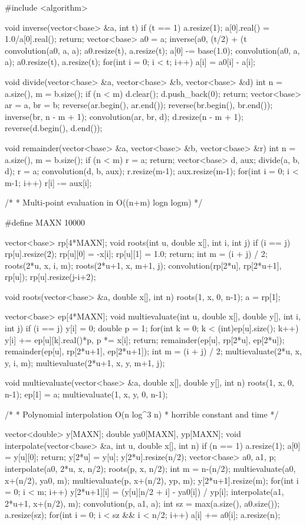 \documentclass[11pt]{article}
\begin{document}
\begin{vncode}
#include <algorithm>

void inverse(vector<base> &a, int t) {
	if (t == 1) {
		a.resize(1); a[0].real() = 1.0/a[0].real();
		return;
	}
	vector<base> a0 = a;
	inverse(a0, (t/2) + (t%
	convolution(a0, a, a);
	a0.resize(t), a.resize(t);
	a[0] -= base(1.0);
	convolution(a0, a, a);
	a0.resize(t), a.resize(t);
	for(int i = 0; i < t; i++) a[i] = a0[i] - a[i];
}

void divide(vector<base> &a, vector<base> &b, vector<base> &d) {
	int n = a.size(), m = b.size();
	if (n < m) {
		d.clear(); d.push_back(0);
		return;
	}
	vector<base> ar = a, br = b;
	reverse(ar.begin(), ar.end());
	reverse(br.begin(), br.end());
	inverse(br, n - m + 1);
	convolution(ar, br, d);
	d.resize(n - m + 1);
	reverse(d.begin(), d.end());
}

void remainder(vector<base> &a, vector<base> &b, vector<base> &r) {
	int n = a.size(), m = b.size();
	if (n < m) { r = a; return; }
	vector<base> d, aux;
	divide(a, b, d);
	r = a;
	convolution(d, b, aux);
	r.resize(m-1); aux.resize(m-1);
	for(int i = 0; i < m-1; i++) r[i] -= aux[i];
}

/*
 * Multi-point evaluation in O((n+m) logn logm)
 */

#define MAXN 10000

vector<base> rp[4*MAXN];
void roots(int u, double x[], int i, int j) {
	if (i == j) {
		rp[u].resize(2); rp[u][0] = -x[i];
		rp[u][1] = 1.0; return;
	}
	int m = (i + j) / 2;
	roots(2*u, x, i, m); roots(2*u+1, x, m+1, j);
	convolution(rp[2*u], rp[2*u+1], rp[u]);
	rp[u].resize(j-i+2);
}

void roots(vector<base> &a, double x[], int n) {
	roots(1, x, 0, n-1); a = rp[1];
}

vector<base> ep[4*MAXN];
void multievaluate(int u, double x[], double y[], int i, int j) {
	if (i == j) {
		y[i] = 0;
		double p = 1;
		for(int k = 0; k < (int)ep[u].size(); k++)
			y[i] += ep[u][k].real()*p, p *= x[i];
		return;
	}
	remainder(ep[u], rp[2*u], ep[2*u]);
	remainder(ep[u], rp[2*u+1], ep[2*u+1]);
	int m = (i + j) / 2;
	multievaluate(2*u, x, y, i, m);
	multievaluate(2*u+1, x, y, m+1, j);
}

void multievaluate(vector<base> &a, double x[], double y[], int n) {
	roots(1, x, 0, n-1); ep[1] = a;
	multievaluate(1, x, y, 0, n-1);
}

/*
 * Polynomial interpolation O(n log^3 n)
 * horrible constant and time
 */

vector<double> y[MAXN];
double ya0[MAXN], yp[MAXN];
void interpolate(vector<base> &a, int u, double x[], int n) {
	if (n == 1) {
		a.resize(1); a[0] = y[u][0];
		return;
	}
	y[2*u] = y[u]; y[2*u].resize(n/2);
	vector<base> a0, a1, p;
	interpolate(a0, 2*u, x, n/2);
	roots(p, x, n/2);
	int m = n-(n/2);
	multievaluate(a0, x+(n/2), ya0, m);
	multievaluate(p,  x+(n/2), yp, m);
	y[2*u+1].resize(m);
	for(int i = 0; i < m; i++)
		y[2*u+1][i] = (y[u][n/2 + i] - ya0[i]) / yp[i];
	interpolate(a1, 2*u+1, x+(n/2), m);
	convolution(p, a1, a);
	int sz = max(a.size(), a0.size());
	a.resize(sz);
	for(int i = 0; i < sz && i < n/2; i++)
		a[i] += a0[i];
	a.resize(n);
}


\end{vncode}
\end{document}
